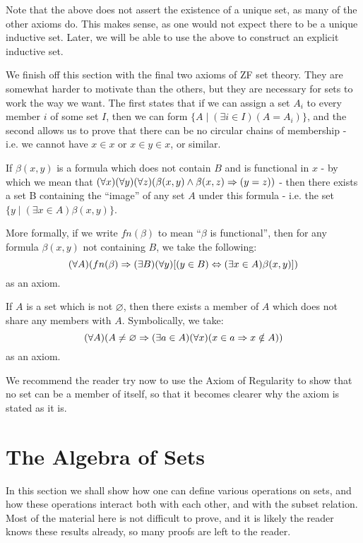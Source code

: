 Note that the above does not assert the existence of a unique set, as many of the other axioms do. This makes sense, as one would not expect there to be a unique inductive set. Later, we will be able to use the above to construct an explicit inductive set.

We finish off this section with the final two axioms of ZF set theory. They are somewhat harder to motivate than the others, but they are necessary for sets to work the way we want. The first states that if we can assign a set $A_i$ to every member $i$ of some set $I$, then we can form $\{A \mid (\exists i\in I)(A=A_i)\}$, and the second allows us to prove that there can be no circular chains of membership - i.e. we cannot have $x\in x$ or $x\in y \in x$, or similar.

\begin{axm}
\label{Axiom: Replacement} 
If $\beta(x, y)$ is a formula which does not contain $B$ and is functional in $x$ - by which we mean that $(\forall x)(\forall y)(\forall z)(\beta(x, y)\land \beta(x, z)\Rightarrow (y=z))$ - then there exists a set B containing the \enquote{image} of any set $A$ under this formula - i.e. the set $\{y\mid(\exists x\in A)\beta(x, y)\}$. 

More formally, if we write $fn(\beta)$ to mean \enquote{$\beta$ is functional}, then for any formula $\beta(x, y)$ not containing $B$, we take the following: $$(\forall A)(fn(\beta)\Rightarrow(\exists B)(\forall y)[(y\in B)\Leftrightarrow(\exists x\in A)\beta(x, y)])$$ as an axiom.
\end{axm}

\begin{axm} 
\label{Axiom: Regularity} 
If $A$ is a set which is not $\varnothing$, then there exists a member of $A$ which does not share any members with $A$. Symbolically, we take: $$(\forall A)(A\neq \varnothing \Rightarrow (\exists a\in A)(\forall x)(x\in a\Rightarrow x\notin A))$$ as an axiom. 
\end{axm}

We recommend the reader try now to use the Axiom of Regularity to show that no set can be a member of itself, so that it becomes clearer why the axiom is stated as it is.

\section{The Algebra of Sets}
\label{--Sec:_The_Algebra_of_Sets}

In this section we shall show how one can define various operations on sets, and how these operations interact both with each other, and with the subset relation. Most of the material here is not difficult to prove, and it is likely the reader knows these results already, so many proofs are left to the reader. 

